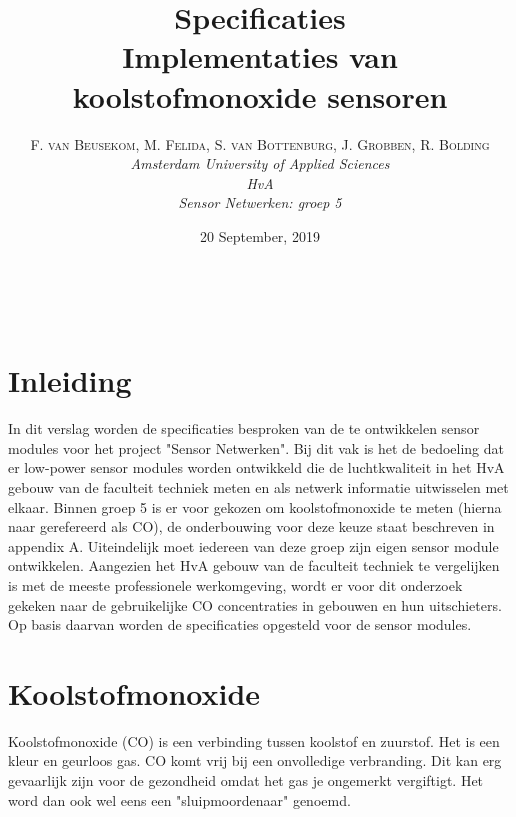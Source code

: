 \documentclass[a4paper, 11pt]{article} %
\title{\textbf{Specificaties}\\ %
Implementaties van koolstofmonoxide sensoren} %
\author{\textsc{F. van Beusekom, M. Felida, S. van Bottenburg, J. Grobben, R. Bolding} %
\\{\textit{Amsterdam University of Applied Sciences\\ 
HvA\\
Sensor Netwerken: groep 5}}} %
\date{20 September, 2019} %
\makeatletter
\renewcommand{\maketitle}{ %
\begin{flushright} %
{\LARGE\@title} %

\vspace{50pt} %

{\large\@author} %
\\\@date %

\vspace{40pt} %
\end{flushright}
}
\makeatother
\begin{document}
\captionsetup{justification=centering}
\hypersetup{hidelinks=true}
\maketitle %




\vspace{10pt} %

\newpage
\section{Inleiding}
In dit verslag worden de specificaties besproken van de te ontwikkelen sensor modules voor het project "Sensor Netwerken". Bij dit vak is het de bedoeling dat er low-power sensor modules worden ontwikkeld die de luchtkwaliteit in het HvA gebouw van de faculteit techniek meten en als netwerk informatie uitwisselen met elkaar. Binnen groep 5 is er voor gekozen om koolstofmonoxide te meten (hierna naar gerefereerd als CO), de onderbouwing voor deze keuze staat beschreven in appendix A. Uiteindelijk moet iedereen van deze groep zijn eigen sensor module ontwikkelen. Aangezien het HvA gebouw van de faculteit techniek te vergelijken is met de meeste professionele werkomgeving, wordt er voor dit onderzoek gekeken naar de gebruikelijke CO concentraties in gebouwen en hun uitschieters. Op basis daarvan worden de specificaties opgesteld voor de sensor modules.

\section{Koolstofmonoxide}
Koolstofmonoxide (CO) is een verbinding tussen koolstof en zuurstof. Het is een kleur en geurloos gas. CO komt vrij bij een onvolledige verbranding. Dit kan erg gevaarlijk zijn voor de gezondheid omdat het gas je ongemerkt vergiftigt. Het word dan ook wel eens een "sluipmoordenaar" genoemd. 
\end{document}
